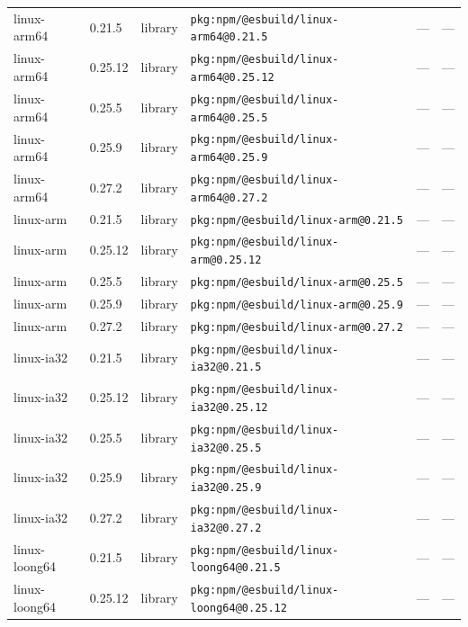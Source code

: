 \documentclass[11pt,a4paper]{article}
\begin{document}
\begin{longtable}{|p{4cm}|p{2cm}|p{1.6cm}|p{5cm}|p{1.5cm}|p{3.5cm}|}
\raggedright linux-arm64 & 0.21.5 & library & \small\texttt{pkg:npm/@esbuild/linux-arm64@0.21.5} & — & \small — \\
\raggedright linux-arm64 & 0.25.12 & library & \small\texttt{pkg:npm/@esbuild/linux-arm64@0.25.12} & — & \small — \\
\raggedright linux-arm64 & 0.25.5 & library & \small\texttt{pkg:npm/@esbuild/linux-arm64@0.25.5} & — & \small — \\
\raggedright linux-arm64 & 0.25.9 & library & \small\texttt{pkg:npm/@esbuild/linux-arm64@0.25.9} & — & \small — \\
\raggedright linux-arm64 & 0.27.2 & library & \small\texttt{pkg:npm/@esbuild/linux-arm64@0.27.2} & — & \small — \\
\raggedright linux-arm & 0.21.5 & library & \small\texttt{pkg:npm/@esbuild/linux-arm@0.21.5} & — & \small — \\
\raggedright linux-arm & 0.25.12 & library & \small\texttt{pkg:npm/@esbuild/linux-arm@0.25.12} & — & \small — \\
\raggedright linux-arm & 0.25.5 & library & \small\texttt{pkg:npm/@esbuild/linux-arm@0.25.5} & — & \small — \\
\raggedright linux-arm & 0.25.9 & library & \small\texttt{pkg:npm/@esbuild/linux-arm@0.25.9} & — & \small — \\
\raggedright linux-arm & 0.27.2 & library & \small\texttt{pkg:npm/@esbuild/linux-arm@0.27.2} & — & \small — \\
\raggedright linux-ia32 & 0.21.5 & library & \small\texttt{pkg:npm/@esbuild/linux-ia32@0.21.5} & — & \small — \\
\raggedright linux-ia32 & 0.25.12 & library & \small\texttt{pkg:npm/@esbuild/linux-ia32@0.25.12} & — & \small — \\
\raggedright linux-ia32 & 0.25.5 & library & \small\texttt{pkg:npm/@esbuild/linux-ia32@0.25.5} & — & \small — \\
\raggedright linux-ia32 & 0.25.9 & library & \small\texttt{pkg:npm/@esbuild/linux-ia32@0.25.9} & — & \small — \\
\raggedright linux-ia32 & 0.27.2 & library & \small\texttt{pkg:npm/@esbuild/linux-ia32@0.27.2} & — & \small — \\
\raggedright linux-loong64 & 0.21.5 & library & \small\texttt{pkg:npm/@esbuild/linux-loong64@0.21.5} & — & \small — \\
\raggedright linux-loong64 & 0.25.12 & library & \small\texttt{pkg:npm/@esbuild/linux-loong64@0.25.12} & — & \small — \\

\end{longtable}
\end{document}
